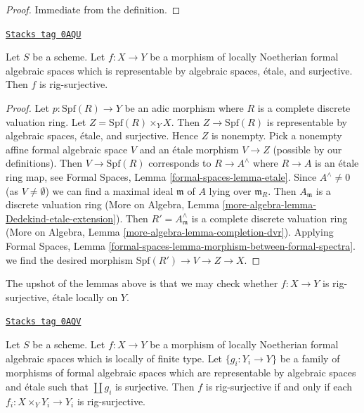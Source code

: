 \begin{proof}
Immediate from the definition.
\end{proof}

\begin{lemma}
\label{restricted-lemma-etale-covering-rig-surjective}
\href{https://stacks.math.columbia.edu/tag/0AQU}{\texttt{Stacks tag 0AQU}}

Let $S$ be a scheme. Let $f : X \to Y$ be a morphism of locally Noetherian
formal algebraic spaces which is representable by algebraic spaces, \'etale,
and surjective. Then $f$ is rig-surjective.
\end{lemma}

\begin{proof}
Let $p : \text{Spf}(R) \to Y$ be an adic morphism where $R$ is a complete
discrete valuation ring. Let $Z = \text{Spf}(R) \times_Y X$. Then
$Z \to \text{Spf}(R)$ is representable by algebraic spaces, \'etale, and
surjective. Hence $Z$ is nonempty. Pick a nonempty affine formal algebraic
space $V$ and an \'etale morphism $V \to Z$ (possible by our definitions).
Then $V \to \text{Spf}(R)$ corresponds to $R \to A^\wedge$ where
$R \to A$ is an \'etale ring map, see Formal Spaces, Lemma
\ref{formal-spaces-lemma-etale}. Since $A^\wedge \not = 0$
(as $V \not = \emptyset$) we can find a maximal ideal $\mathfrak m$
of $A$ lying over $\mathfrak m_R$. Then $A_\mathfrak m$ is a discrete
valuation ring (More on Algebra, Lemma
\ref{more-algebra-lemma-Dedekind-etale-extension}).
Then $R' = A_\mathfrak m^\wedge$ is a complete discrete valuation ring
(More on Algebra, Lemma \ref{more-algebra-lemma-completion-dvr}).
Applying Formal Spaces, Lemma
\ref{formal-spaces-lemma-morphism-between-formal-spectra}.
we find the desired morphism $\text{Spf}(R') \to V \to Z \to X$.
\end{proof}

The upshot of the lemmas above is that we may check whether
$f : X \to Y$ is rig-surjective, \'etale locally on $Y$.

\begin{lemma}[Upshot]
\label{restricted-lemma-upshot}
\href{https://stacks.math.columbia.edu/tag/0AQV}{\texttt{Stacks tag 0AQV}}

Let $S$ be a scheme. Let $f : X \to Y$ be a morphism of locally
Noetherian formal algebraic spaces which is locally of finite type.
Let $\{g_i : Y_i \to Y\}$ be a family of morphisms of formal
algebraic spaces which are representable by algebraic spaces and
\'etale such that $\coprod g_i$ is surjective.
Then $f$ is rig-surjective if and only if each
$f_i : X \times_Y Y_i \to Y_i$ is rig-surjective.
\end{lemma}

